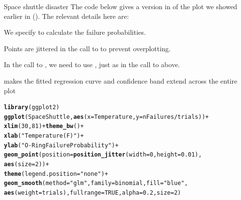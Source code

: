 \documentclass[11pt]{book}\usepackage[]{graphicx}\usepackage[]{color}
\makeatletter
\newcommand{\hlnum}[1]{\textcolor[rgb]{0.686,0.059,0.569}{#1}}%
\newcommand{\hlstr}[1]{\textcolor[rgb]{0.192,0.494,0.8}{#1}}%
\newcommand{\hlopt}[1]{\textcolor[rgb]{0,0,0}{#1}}%
\newcommand{\hlstd}[1]{\textcolor[rgb]{0.345,0.345,0.345}{#1}}%
\newcommand{\hlkwc}[1]{\textcolor[rgb]{0.333,0.667,0.333}{#1}}%
\newcommand{\hlkwd}[1]{\textcolor[rgb]{0.737,0.353,0.396}{\textbf{#1}}}%
\newenvironment{kframe}{%
 \def\at@end@of@kframe{}%
 \ifinner\ifhmode%
  \def\at@end@of@kframe{\end{minipage}}%
  \begin{minipage}{\columnwidth}%
 \fi\fi%
 \def\FrameCommand##1{\hskip\@totalleftmargin \hskip-\fboxsep
 \colorbox{shadecolor}{##1}\hskip-\fboxsep
     \hskip-\linewidth \hskip-\@totalleftmargin \hskip\columnwidth}%
 \MakeFramed {\advance\hsize-\width
   \@totalleftmargin\z@ \linewidth\hsize
   \@setminipage}}%
 {\par\unskip\endMakeFramed%
 \at@end@of@kframe}
\newenvironment{knitrout}{}{} %
\renewenvironment{knitrout}{\small\renewcommand{\baselinestretch}{.85}}{} %
\makeatother
\begin{document}
\begin{Example}{Space shuttle disaster}
The code below gives a  version in 
of the plot we showed earlier in  ().
The relevant details here are:
\begin{itemize*}
  \item We specify  to calculate the failure probabilities.
  \item Points are jittered in the call to  to prevent overplotting.
  \item In the call to , we need to use ,
  just as in the call to  above.
  \item {} makes the fitted regression curve and
  confidence band extend across the entire plot
\end{itemize*}
\begin{knitrout}
\color{fgcolor}\begin{kframe}
\begin{alltt}
\hlkwd{library}\hlstd{(ggplot2)}
\hlkwd{ggplot}\hlstd{(SpaceShuttle,} \hlkwd{aes}\hlstd{(}\hlkwc{x} \hlstd{= Temperature,} \hlkwc{y} \hlstd{= nFailures} \hlopt{/} \hlstd{trials))} \hlopt{+}
  \hlkwd{xlim}\hlstd{(}\hlnum{30}\hlstd{,} \hlnum{81}\hlstd{)} \hlopt{+} \hlkwd{theme_bw}\hlstd{()} \hlopt{+}
  \hlkwd{xlab}\hlstd{(}\hlstr{"Temperature (F)"}\hlstd{)} \hlopt{+}
  \hlkwd{ylab}\hlstd{(}\hlstr{"O-Ring Failure Probability"}\hlstd{)} \hlopt{+}
  \hlkwd{geom_point}\hlstd{(}\hlkwc{position}\hlstd{=}\hlkwd{position_jitter}\hlstd{(}\hlkwc{width}\hlstd{=}\hlnum{0}\hlstd{,} \hlkwc{height}\hlstd{=}\hlnum{0.01}\hlstd{),}
             \hlkwd{aes}\hlstd{(}\hlkwc{size} \hlstd{=} \hlnum{2}\hlstd{))} \hlopt{+}
  \hlkwd{theme}\hlstd{(}\hlkwc{legend.position}\hlstd{=}\hlstr{"none"}\hlstd{)} \hlopt{+}
  \hlkwd{geom_smooth}\hlstd{(}\hlkwc{method} \hlstd{=} \hlstr{"glm"}\hlstd{,} \hlkwc{family} \hlstd{= binomial,} \hlkwc{fill}\hlstd{=}\hlstr{"blue"}\hlstd{,}
              \hlkwd{aes}\hlstd{(}\hlkwc{weight} \hlstd{= trials),} \hlkwc{fullrange} \hlstd{=} \hlnum{TRUE}\hlstd{,} \hlkwc{alpha}\hlstd{=}\hlnum{0.2}\hlstd{,} \hlkwc{size}\hlstd{=}\hlnum{2}\hlstd{)}
\end{alltt}
\end{kframe}
\end{knitrout}


\end{Example}
\end{document}

